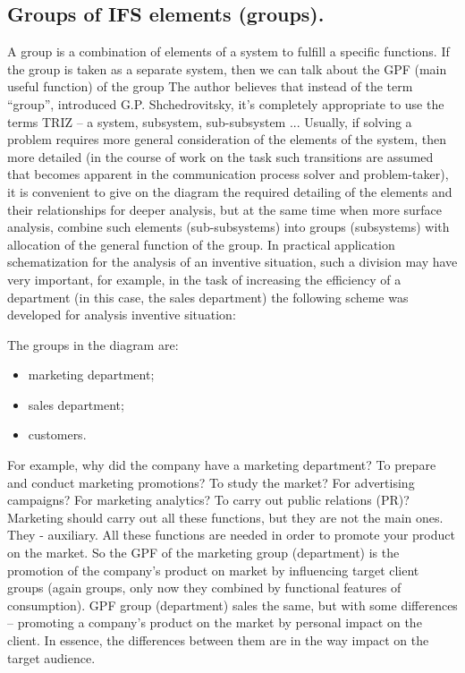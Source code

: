\subsection*{Groups of IFS elements (groups).}
A group is a combination of elements of a system to fulfill a specific
functions. If the group is taken as a separate system, then we can talk about
the GPF (main useful function) of the group The author believes that instead
of the term “group”, introduced G.P. Shchedrovitsky, it’s completely
appropriate to use the terms TRIZ -- a system, subsystem, sub-subsystem
... Usually, if solving a problem requires more general consideration of the
elements of the system, then more detailed (in the course of work on the task
such transitions are assumed that becomes apparent in the communication
process solver and problem-taker), it is convenient to give on the diagram the
required detailing of the elements and their relationships for deeper
analysis, but at the same time when more surface analysis, combine such
elements (sub-subsystems) into groups (subsystems) with allocation of the
general function of the group. In practical application schematization for the
analysis of an inventive situation, such a division may have very important,
for example, in the task of increasing the efficiency of a department (in this
case, the sales department) the following scheme was developed for analysis
inventive situation:


The groups in the diagram are:
\begin{itemize}\itemsep0pt
\item marketing department;
\item sales department;
\item customers.
\end{itemize}

For example, why did the company have a marketing department? To prepare and
conduct marketing promotions? To study the market? For advertising campaigns?
For marketing analytics? To carry out public relations (PR)? Marketing should
carry out all these functions, but they are not the main ones. They -
auxiliary. All these functions are needed in order to promote your product on
the market. So the GPF of the marketing group (department) is the promotion of
the company's product on market by influencing target client groups (again
groups, only now they combined by functional features of consumption). GPF
group (department) sales the same, but with some differences -- promoting a
company's product on the market by personal impact on the client. In essence,
the differences between them are in the way impact on the target audience.


